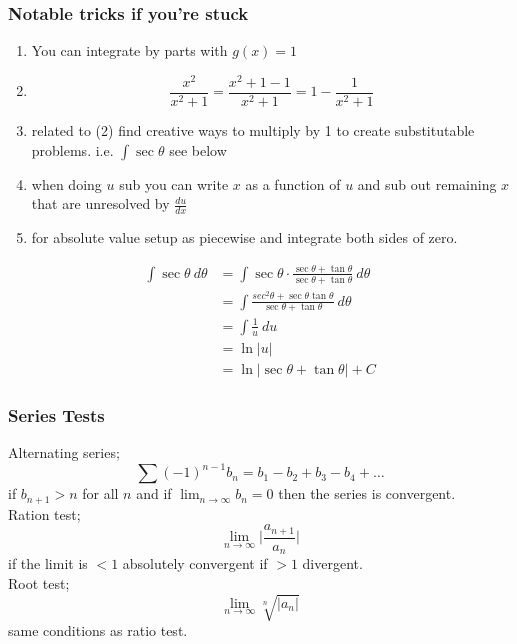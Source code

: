 \documentclass{article}
\begin{document}
\begin{multicols}{2}
\subsubsection*{Notable tricks if you're stuck}
\begin{enumerate}
	\item You can integrate by parts with $g(x) = 1$
	\item \[ \frac{x^2}{x^2+1} = \frac{x^2 + 1 - 1}{x^2 +1} = 1 - \frac{1}{x^2+1} \]
	\item related to (2) find creative ways to multiply by 1 to create substitutable problems. i.e. $\int \sec \theta$ see below
	\item when doing $u$ sub you can write $x$ as a function of $u$ and sub out remaining $x$ that are unresolved by $\frac{du}{dx}$
	\item for absolute value setup as piecewise and integrate both sides of zero.
\end{enumerate}

\begin{align*}
	\int \sec \theta \ d \theta &= \int \sec \theta \cdot \frac{\sec \theta + \tan \theta}{\sec \theta + \tan \theta} \ d \theta \\
				    &= \int \frac{sec^2 \theta + \sec \theta \tan \theta}{\sec \theta + \tan \theta} \ d \theta \\
				    &= \int \frac{1}{u} \ du \\
				    &= \ln|u| \\
				    &= \ln|\sec \theta + \tan \theta | + C
\end{align*}

\subsubsection*{Series Tests}
Alternating series;
\[
	\sum (-1)^{n-1} b_n = b_1 - b_2 + b_3 - b_4 +\dots
\]
if $b_{n+1} > n$ for all $n$ and if $\lim_{n \to \infty} b_n = 0$ then the series is convergent.\\
Ration test;
\[
	\lim_{n \to \infty} \Biggr\vert \frac{a_{n+1}}{a_n} \Biggr\vert
\]
if the limit is $< 1$ absolutely convergent if $> 1$ divergent.\\
Root test;
\[
	\lim_{n \to \infty} \sqrt[n]{|a_n|}
\]
same conditions as ratio test.

\end{multicols}
\end{document}

